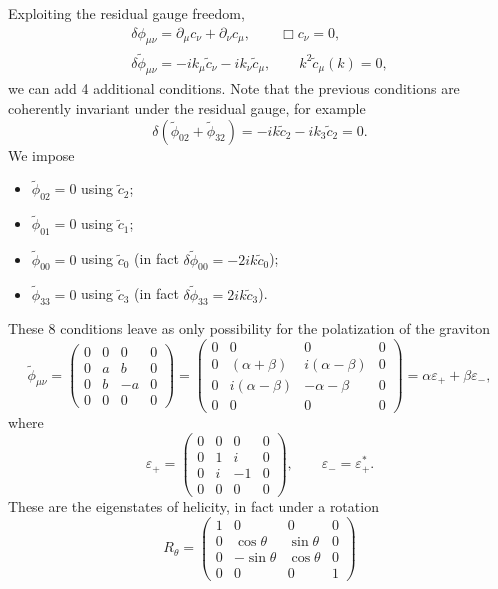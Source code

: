 \documentclass[a4paper,12pt]{book}
\renewcommand{\epsilon}{\varepsilon}
\theoremstyle{definition}
\theoremstyle{remark}
\begin{document}
Exploiting the residual gauge freedom,
\begin{gather*}
\delta\phi_{\mu\nu}=\partial_\mu c_\nu+\partial_\nu c_\mu,\qquad \Box c_\nu=0,\\
\delta\tilde\phi_{\mu\nu}=-ik_\mu\tilde c_\nu-ik_\nu\tilde c_\mu,\qquad k^2\tilde c_\mu(k)=0,
\end{gather*}
we can add 4 additional conditions. Note that the previous conditions are coherently invariant under the residual gauge, for example
\[\delta(\tilde\phi_{02}+\tilde\phi_{32})=-ik\tilde c_2-ik_3\tilde c_2=0.\]
We impose
\begin{itemize}
\item $\tilde\phi_{02}=0$ using $\tilde c_2$;
\item $\tilde\phi_{01}=0$ using $\tilde c_1$;
\item $\tilde\phi_{00}=0$ using $\tilde c_0$ (in fact $\delta\tilde\phi_{00}=-2ik\tilde c_0$);
\item $\tilde\phi_{33}=0$ using $\tilde c_3$ (in fact $\delta\tilde\phi_{33}=2ik\tilde c_3$).
\end{itemize}
These 8 conditions leave as only possibility for the polatization of the graviton
\[\tilde\phi_{\mu\nu}=
\begin{pmatrix}
0 & 0 & 0 & 0\\
0 & a & b & 0\\
0 & b & -a & 0\\
0 & 0 & 0 & 0
\end{pmatrix}=
\begin{pmatrix}
0 & 0 & 0 & 0\\
0 & (\alpha+\beta) & i(\alpha-\beta) & 0\\
0 & i(\alpha-\beta) & -\alpha-\beta & 0\\
0 & 0 & 0 & 0
\end{pmatrix}
=\alpha\epsilon_++\beta\epsilon_-,\]
where
\[\epsilon_+=
\begin{pmatrix}
0 & 0 & 0 & 0\\
0 & 1 & i & 0\\
0 & i & -1 & 0\\
0 & 0 & 0 & 0
\end{pmatrix},\qquad
\epsilon_-=\epsilon_+^*.
\]
These are the eigenstates of helicity, in fact under a rotation
\[R_\theta=
\begin{pmatrix}
1 & 0 & 0 & 0\\
0 & \cos\theta & \sin\theta & 0\\
0 & -\sin\theta & \cos\theta & 0\\
0 & 0 & 0 & 1
\end{pmatrix}\]
\end{document}
